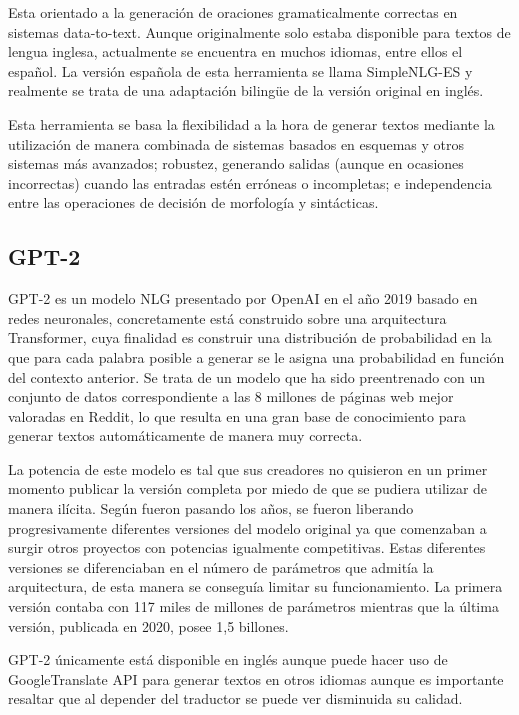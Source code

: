 Esta orientado a la generación de oraciones gramaticalmente correctas en sistemas data-to-text. Aunque originalmente solo estaba disponible para textos de lengua inglesa, actualmente se encuentra en muchos idiomas, entre ellos el español. La versión española de esta herramienta se llama SimpleNLG-ES y realmente se trata de una adaptación bilingüe de la versión original en inglés.

Esta herramienta se basa la flexibilidad a la hora de generar textos mediante la utilización de manera combinada de sistemas basados en esquemas y otros sistemas más avanzados; robustez, generando salidas (aunque en ocasiones incorrectas) cuando las entradas estén erróneas o incompletas; e independencia entre las operaciones de decisión de morfología y sintácticas.

\subsection{GPT-2}
GPT-2 es un modelo NLG presentado por OpenAI en el año 2019 basado en redes neuronales, concretamente está construido sobre una arquitectura Transformer, cuya finalidad es construir una distribución de probabilidad en la que para cada palabra posible a generar se le asigna una probabilidad en función del contexto anterior. Se trata de un modelo que ha sido preentrenado con un conjunto de datos correspondiente a las 8 millones de páginas web mejor valoradas en Reddit, lo que resulta en una gran base de conocimiento para generar textos automáticamente de manera muy correcta.

La potencia de este modelo es tal que sus creadores no quisieron en un primer momento publicar la versión completa por miedo de que se pudiera utilizar de manera ilícita. Según fueron pasando los años, se fueron liberando progresivamente diferentes versiones del modelo original ya que comenzaban a surgir otros proyectos con potencias igualmente competitivas. Estas diferentes versiones se diferenciaban en el número de parámetros que admitía la arquitectura, de esta manera se conseguía limitar su funcionamiento. La primera versión contaba con 117 miles de millones de parámetros mientras que la última versión, publicada en 2020, posee 1,5 billones.

GPT-2 únicamente está disponible en inglés aunque puede hacer uso de GoogleTranslate API para generar textos en otros idiomas aunque es importante resaltar que al depender del traductor se puede ver disminuida su calidad.

